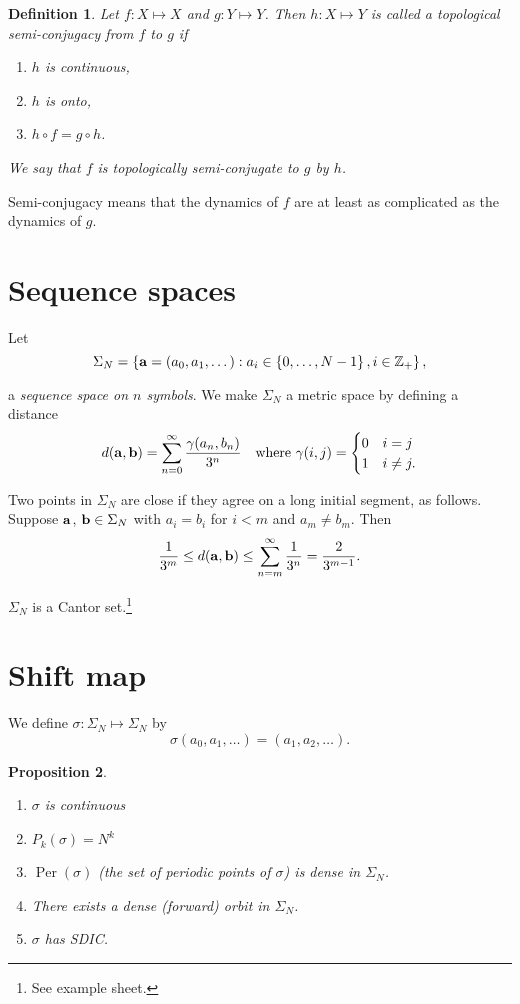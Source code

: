 \documentclass{notes}
\DeclareMathOperator{\Per}{Per}
\theoremstyle{plain}
\newtheorem{proposition}{Proposition}[chapter]
\newtheorem{definition}[proposition]{Definition}
\begin{document}
\begin{definition}
Let $f \colon X \mapsto X$ and $g \colon Y \mapsto Y$.  Then $h \colon X
\mapsto Y$ is called a \emph{topological semi-conjugacy} from $f$ to $g$ if
\begin{enumerate}
\item $h$ is continuous,
\item $h$ is onto,
\item $h \circ f = g \circ h$.
\end{enumerate}

We say that $f$ is topologically semi-conjugate to $g$ by $h$.
\end{definition}

Semi-conjugacy means that the dynamics of $f$ are at least as complicated
as the dynamics of $g$.

\section{Sequence spaces}

\renewcommand{\a}{\vect{a}}
\renewcommand{\b}{\vect{b}}

Let
\[
\Sigma_N = \left\{ \a = (a_0,a_1,\dots) : a_i \in \left\{ 0,\dots,N-1
\right\}, i \in \Z_+\right\},
\]

a \emph{sequence space on $n$ symbols}.  We make $\Sigma_N$ a metric
space by defining a distance
\[
d(\a, \b) = \sum_{n=0}^\infty \frac{\gamma(a_n,b_n)}{3^n} \quad
\text{where } \gamma(i,j) = \begin{cases}
0 & i=j \\
1 & i \neq j.
\end{cases}
\]

Two points in $\Sigma_N$ are close if they agree on a long initial
segment, as follows.  Suppose $\a$, $\b \in \Sigma_N$ with
$a_i = b_i$ for $i < m$ and $a_m \neq b_m$.  Then
\[
\frac{1}{3^m} \le d(\a,\b) \le \sum_{n=m}^\infty \frac{1}{3^n}
= \frac{2}{3^{m-1}}.
\]

$\Sigma_N$ is a Cantor set.\footnote{See example sheet.}

\section{Shift map}

We define $\sigma \colon \Sigma_N \mapsto \Sigma_N$ by
\[
\sigma(a_0,a_1,\dots) = (a_1,a_2,\dots).
\]

\begin{proposition}\hfill
  \begin{enumerate}
  \item $\sigma$ is continuous
  \item $P_k(\sigma) = N^k$
  \item $\Per(\sigma)$ (the set of periodic points of $\sigma$) is
    dense in $\Sigma_N$.
  \item There exists a dense (forward) orbit in $\Sigma_N$.
  \item $\sigma$ has SDIC.
  \end{enumerate}
\end{proposition}
\end{document}
